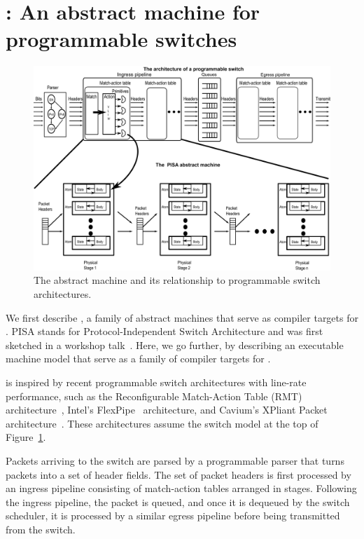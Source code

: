 \section{\absmachine: An abstract machine for programmable switches}
\label{s:absmachine}


\begin{figure}[!t]
  \includegraphics[width=\textwidth]{pisa.pdf}
  \caption{The \absmachine abstract machine and its relationship to
  programmable switch architectures.}
  \label{fig:switch}
\end{figure}

We first describe \absmachine, a family of abstract machines that serve as
compiler targets for \pktlanguage. PISA stands for Protocol-Independent Switch
Architecture and was first sketched in a workshop talk~\cite{nick_p4}. Here,
we go further, by describing an executable machine model that serve as a family
of compiler targets for \pktlanguage.

\absmachine is inspired by recent programmable switch architectures with
line-rate performance, such as the Reconfigurable Match-Action Table (RMT)
architecture~\cite{rmt}, Intel's FlexPipe~\cite{flexpipe} architecture, and
Cavium's XPliant Packet architecture~\cite{xpliant}. These architectures assume
the switch model at the top of Figure~\ref{fig:switch}.

Packets arriving to the switch are parsed by a programmable parser that turns
packets into a set of header fields. The set of packet headers is first
processed by an ingress pipeline consisting of match-action tables arranged in
stages. Following the ingress pipeline, the packet is queued, and once it is
dequeued by the switch scheduler, it is processed by a similar egress pipeline
before being transmitted from the switch.


